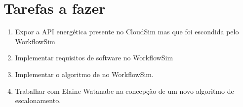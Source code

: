 \section{Tarefas a fazer}
\label{sec:tarefas_a_fazer}
	\begin{enumerate}
		\item Expor a API energética presente no CloudSim mas que foi escondida
		pelo WorkflowSim
		\item Implementar requisitos de software no WorkflowSim
		\item Implementar o algoritmo de \cite{chaves:scheduling_software_requirements} 
		no WorkflowSim.
		\item Trabalhar com Elaine Watanabe na concepção de um novo algoritmo 
		de escalonamento.
	\end{enumerate}

